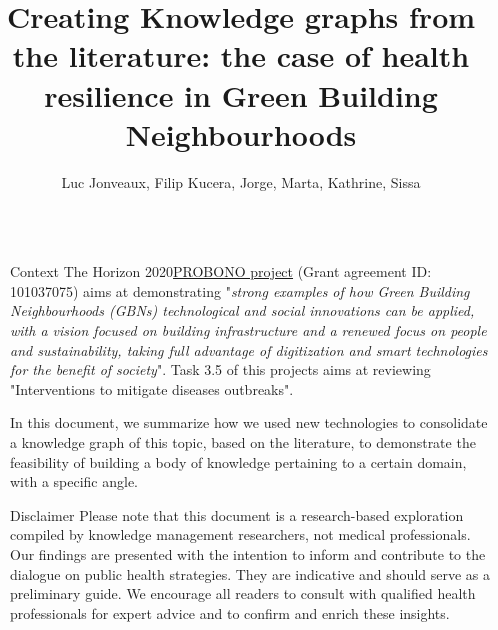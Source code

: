 \documentclass[final]{beamer}
\title{Creating Knowledge graphs from the literature: the case of health resilience in Green Building Neighbourhoods} %
\author{Luc Jonveaux, Filip Kucera, Jorge, Marta, Kathrine, Sissa} %
\institute{The Integrator-centric approach for realising innovative energy efficient buildings in connected sustainable green neighbourhoods project} %
\newlength{\sepmargin}
\newlength{\onecolwid}
\begin{document}
  \setlength{\belowcaptionskip}{2ex} %
  \setlength\belowdisplayshortskip{1ex} %
  
  
  \begin{frame}[t] %

      \begin{columns}[t] %
	  
      \begin{column}{\sepmargin}\end{column}
      
	    \begin{column}{\onecolwid} %


		  \begin{block}{Context}
The Horizon 2020\href{https://doi.org/10.3030/101037075}{PROBONO project} (Grant agreement ID: 101037075) aims at demonstrating "\textit{strong examples of how Green Building Neighbourhoods (GBNs) technological and social innovations can be applied, with a vision focused on building infrastructure and a renewed focus on people and sustainability, taking full advantage of digitization and smart technologies for the benefit of society}". Task 3.5 of this projects  aims at reviewing "Interventions to mitigate diseases outbreaks".

In this document, we summarize how we used new technologies to consolidate a knowledge graph of this topic, based on the literature, to demonstrate the feasibility of building a body of knowledge pertaining to a certain domain, with a specific angle.
\end{block}

\begin{block}{Disclaimer}
Please note that this document is a research-based exploration compiled by knowledge management researchers, not medical professionals. Our findings are presented with the intention to inform and contribute to the dialogue on public health strategies. They are indicative and should serve as a preliminary guide. We encourage all readers to consult with qualified health professionals for expert advice and to confirm and enrich these insights.


\end{block}
\end{column}
\end{columns}
\end{frame}
\end{document}
